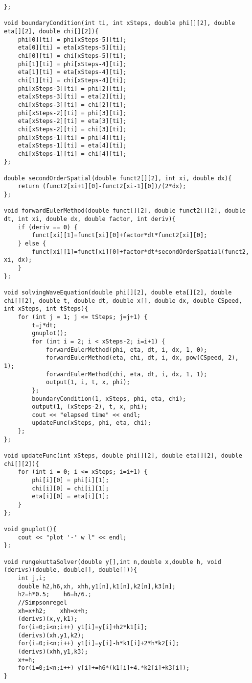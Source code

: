 \documentclass[10pt,fleqn,reqno,a4paper]{article}
\begin{document}
\begin{verbatim}
};

void boundaryCondition(int ti, int xSteps, double phi[][2], double eta[][2], double chi[][2]){
    phi[0][ti] = phi[xSteps-5][ti];
    eta[0][ti] = eta[xSteps-5][ti];
    chi[0][ti] = chi[xSteps-5][ti];
    phi[1][ti] = phi[xSteps-4][ti];
    eta[1][ti] = eta[xSteps-4][ti];
    chi[1][ti] = chi[xSteps-4][ti];
    phi[xSteps-3][ti] = phi[2][ti];
    eta[xSteps-3][ti] = eta[2][ti];
    chi[xSteps-3][ti] = chi[2][ti];
    phi[xSteps-2][ti] = phi[3][ti];
    eta[xSteps-2][ti] = eta[3][ti];
    chi[xSteps-2][ti] = chi[3][ti];
    phi[xSteps-1][ti] = phi[4][ti];
    eta[xSteps-1][ti] = eta[4][ti];
    chi[xSteps-1][ti] = chi[4][ti];
};

double secondOrderSpatial(double funct2[][2], int xi, double dx){
    return (funct2[xi+1][0]-funct2[xi-1][0])/(2*dx);
};

void forwardEulerMethod(double funct[][2], double funct2[][2], double dt, int xi, double dx, double factor, int deriv){
    if (deriv == 0) {
        funct[xi][1]=funct[xi][0]+factor*dt*funct2[xi][0];
    } else {
        funct[xi][1]=funct[xi][0]+factor*dt*secondOrderSpatial(funct2, xi, dx);
    }
};

void solvingWaveEquation(double phi[][2], double eta[][2], double chi[][2], double t, double dt, double x[], double dx, double CSpeed, int xSteps, int tSteps){
    for (int j = 1; j <= tSteps; j=j+1) {
        t=j*dt;
        gnuplot();
        for (int i = 2; i < xSteps-2; i=i+1) {
            forwardEulerMethod(phi, eta, dt, i, dx, 1, 0);
            forwardEulerMethod(eta, chi, dt, i, dx, pow(CSpeed, 2), 1);
            forwardEulerMethod(chi, eta, dt, i, dx, 1, 1);
            output(1, i, t, x, phi);
        };
        boundaryCondition(1, xSteps, phi, eta, chi);
        output(1, (xSteps-2), t, x, phi);
        cout << "elapsed time" << endl;
        updateFunc(xSteps, phi, eta, chi);
    };
};

void updateFunc(int xSteps, double phi[][2], double eta[][2], double chi[][2]){
    for (int i = 0; i <= xSteps; i=i+1) {
        phi[i][0] = phi[i][1];
        chi[i][0] = chi[i][1];
        eta[i][0] = eta[i][1];
	}
};

void gnuplot(){
    cout << "plot '-' w l" << endl;
};

void rungekuttaSolver(double y[],int n,double x,double h, void (derivs)(double, double[], double[])){
    int j,i;
    double h2,h6,xh, xhh,y1[n],k1[n],k2[n],k3[n];
    h2=h*0.5;    h6=h/6.;
    //Simpsonregel
    xh=x+h2;	xhh=x+h;
    (derivs)(x,y,k1);
    for(i=0;i<n;i++) y1[i]=y[i]+h2*k1[i];
    (derivs)(xh,y1,k2);
    for(i=0;i<n;i++) y1[i]=y[i]-h*k1[i]+2*h*k2[i];
    (derivs)(xhh,y1,k3);
    x+=h;
    for(i=0;i<n;i++) y[i]+=h6*(k1[i]+4.*k2[i]+k3[i]);
}


\end{verbatim}
\end{document}
